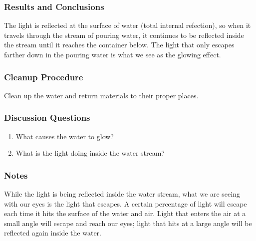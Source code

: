 \subsubsection*{Results and Conclusions}
The light is reflected at the surface of water (total internal refection), so when it travels through the stream of pouring water, it continues to be reflected inside the stream until it reaches the container below. The light that only escapes farther down in the pouring water is what we see as the glowing
effect.

\subsubsection*{Cleanup Procedure}
Clean up the water and return materials to their proper places.

\subsubsection*{Discussion Questions}
\begin{enumerate}
\item{What causes the water to glow?}
\item{What is the light doing inside the water stream?}
\end{enumerate}

\subsubsection*{Notes}
While the light is being reflected inside the water stream, what we are seeing with our eyes is the light that escapes.  A certain percentage of light will escape each time it hits the surface of the water and air.  Light that enters the air at a small angle will escape and reach our eyes; light that hits at a large angle will be reflected again inside the water.
